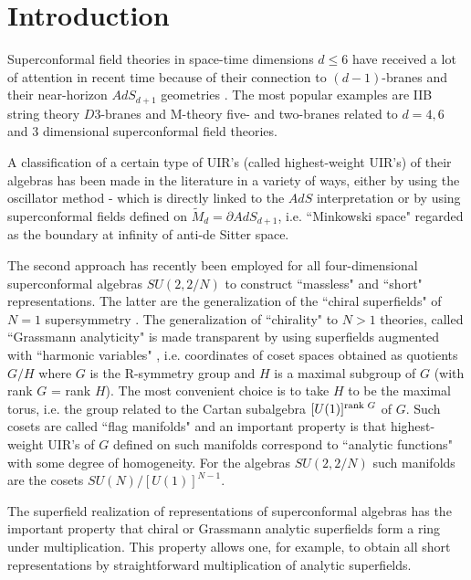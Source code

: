 \documentclass[a4paper,12pt]{article}
\begin{document}
\section{Introduction}



Superconformal field theories in space-time dimensions $d\leq 6$ 
have received a lot of attention in recent time because of their 
connection to $(d-1)$-branes and their near-horizon $AdS_{d+1}$ 
geometries \cite{AGMOO}. The most popular examples are IIB string 
theory $D3$-branes and M-theory five- and two-branes related to 
$d=4,6$ and $3$ dimensional superconformal field theories. 



A classification of a certain type of UIR's (called highest-weight 
UIR's) of their algebras has been made in the literature in a 
variety of ways, either by using the oscillator method 
\cite{gm}-\cite{GNW} which is directly linked to the $AdS$ 
interpretation or by using superconformal fields defined on 
$\tilde M_d = \partial AdS_{d+1}$, i.e. ``Minkowski space" 
regarded as the boundary at infinity of anti-de Sitter space. 



The second approach has recently been employed \cite{AFSZ,FS} for 
all four-dimensional superconformal algebras $SU(2,2/N)$ to 
construct ``massless" and ``short" representations. The latter are 
the generalization of the ``chiral superfields" of $N=1$ 
supersymmetry \cite{fwz}. The generalization of ``chirality" to 
$N>1$ theories, called ``Grassmann analyticity" \cite{GIO} is made 
transparent by using superfields augmented with ``harmonic 
variables" \cite{GIKOS,hh}, i.e. coordinates of coset spaces 
obtained as quotients $G/H$ where $G$ is the R-symmetry group and 
$H$ is a maximal subgroup of $G$ (with rank $G$ = rank $H$). The 
most convenient choice is to take $H$ to be the maximal torus, 
i.e. the group related to the Cartan subalgebra 
$[U(1)]^{\mbox{\scriptsize rank }G}$ of $G$. Such cosets are 
called ``flag manifolds" \cite{Knapp,hh} and an important property 
is that highest-weight UIR's of $G$ defined on such manifolds 
correspond to ``analytic functions" with some degree of 
homogeneity. For the algebras $SU(2,2/N)$ such manifolds are the 
cosets $SU(N)/[U(1)]^{N-1}$. 

The superfield realization of representations of superconformal algebras has
the important property that chiral or Grassmann analytic superfields form a ring
under multiplication. This property allows one, for example, to obtain all short
representations by straightforward multiplication of analytic superfields.
\end{document}
